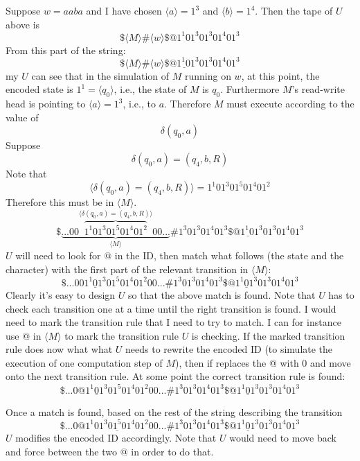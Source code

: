 Suppose $w = aaba$ and I have chosen
$\langle a \rangle = 1^3$ and
$\langle b \rangle = 1^4$.
Then the tape of $U$ above is
\[
\$ \langle M \rangle \# \langle w \rangle
\$ @ 1^1 0 1^3 0 1^3 0 1^4 0 1^3
\]
From this part of the string:
\[
\$ \langle M \rangle \# \langle w \rangle
\$ \underline{@ 1^1 0 1^3} 0 1^3 0 1^4 0 1^3
\]
my $U$ can see that in the simulation of $M$ running on $w$,
at this point, the encoded state is $1^1 = \langle q_0 \rangle$,
i.e., the state of $M$ is $q_0$.
Furthermore $M$'s read-write head is
pointing to $\langle a \rangle = 1^3$, i.e., to $a$.
Therefore $M$ must execute according to
the value of
\[
\delta(q_0, a)
\]
Suppose
\[
\delta(q_0, a) = (q_4, b, R)
\]
Note that
\[
\biggl\langle
\delta(q_0, a) = (q_4, b, R)
\biggr\rangle
=
1^1 0 1^3 0 1^5 0 1^4 0 1^2
\]
Therefore this must be in $\langle M \rangle$.
\[
\$
\underbrace{...
  00
  \overbrace{1^1 0 1^3 0 1^5 0 1^4 0 1^2}
  ^
  {\textstyle \langle \delta(q_0, a) = (q_4, b, R) \rangle}
  00
  ...}_{\textstyle \langle M \rangle}
\#
1^3 0 1^3 0 1^4 0 1^3
\$
\underline{@ 1^1 0 1^3} 0 1^3 0 1^4 0 1^3
\]
$U$ will need to look for $ @ $ in the ID, then match
what follows (the state and the character)
with the first part of the relevant transition in $\langle M \rangle$:
\[
\$
...
  00
  \underline{1^1 0 1^3} 0 1^5 0 1^4 0 1^2
  00
  ...
\#
1^3 0 1^3 0 1^4 0 1^3
\$
@ \underline{1^1 0 1^3} 0 1^3 0 1^4 0 1^3
\]
Clearly it's easy to design $U$ so that the above
match is found.
Note that $U$ has to check each transition one at a time until
the right transition is found.
I would need to mark the transition rule that I need to
try to match.
I can for instance use $ @ $ in $\langle M \rangle$ to
mark the transition rule $U$ is checking.
If the marked transition rule does now what what $U$
needs to rewrite the encoded ID (to simulate the execution of
one computation step of $M$), then if replaces the @ with 0 and
move onto the next transition rule.
At some point the correct transition rule is found:
\[
\$
...
  0@
  \underline{1^1 0 1^3} 0 1^5 0 1^4 0 1^2
  00
  ...
\#
1^3 0 1^3 0 1^4 0 1^3
\$
@ \underline{1^1 0 1^3} 0 1^3 0 1^4 0 1^3
\]



Once a match is found, based on the rest of the
string describing the transition
\[
\$
...
  0@
  \underline{1^1 0 1^3 0 1^5 0 1^4 0 1^2}
  00
  ...
\#
1^3 0 1^3 0 1^4 0 1^3
\$
@ \underline{1^1 0 1^3} 0 1^3 0 1^4 0 1^3
\]
$U$ modifies the encoded ID accordingly.
Note that $U$ would need to move back and force
between the two $ @ $ in order to do that.

